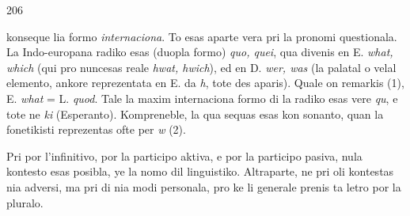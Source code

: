 \begin{VUpage}[210]{206}
\VUornement[7.87mm]{60.62mm}

\VUcontinue
konseque lia formo \textit{internaciona}. To esas aparte vera pri la\nl
pronomi questionala. La Indo-europana radiko esas (duopla\nl
formo) \textit{quo, quei}, qua divenis en E. \textit{what, which} (qui pro\cc
nuncesas reale \textit{hwat, hwich}), ed en D. \textit{wer, was} (la palatal\nl
o velal elemento, ankore reprezentata en E. da \textit{h}, tote des\cc
aparis). Quale on remarkis (1), E. \textit{what} = L. \textit{quod}. Tale la\nl
maxim internaciona formo di la radiko esas vere \textit{qu}, e tote\nl
ne \textit{ki} (Esperanto). Kompreneble, la  qua sequas  esas kon\cc
sonanto, quan la fonetikisti reprezentas ofte per \textit{w} (2).

\VUsaut{13.30mm}
\VUsaut{2.94mm}
\VUsaut{4.95mm}

Pri  por l'infinitivo,  por la participo aktiva, e  por\nl
la participo pasiva, nula kontesto esas posibla, ye la nomo\nl
dil linguistiko. Altraparte, ne pri oli kontestas nia adversi,\nl
ma pri  di nia modi personala, pro ke li generale prenis\nl
ta letro por la pluralo.


\end{VUpage}
